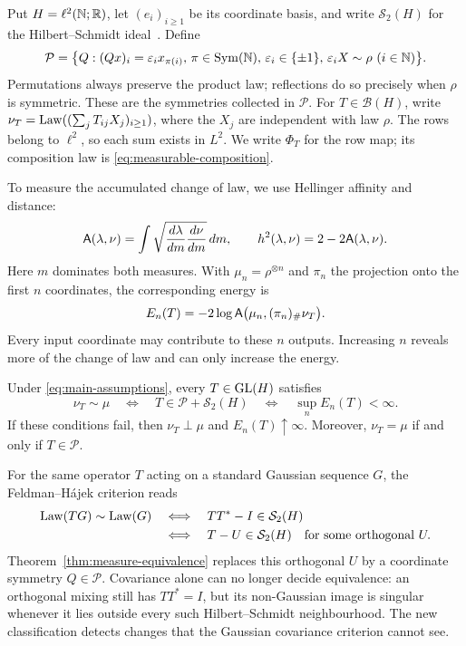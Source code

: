 Put \(H=\ell^2(\mathbb N;\mathbb R)\), let \((e_i)_{i\ge1}\) be its coordinate basis, and
write \(\mathcal S_2(H)\) for the Hilbert--Schmidt ideal~\cite{simon2005trace}.
Define
\begin{equation}
 \mathcal P=\bigl\{Q:(Qx)_i=\varepsilon_i x_{\pi(i)},\,
       \pi\in\operatorname{Sym}(\mathbb N),\,
       \varepsilon_i\in\{\pm1\},\,
       \varepsilon_iX\sim\rho\ (i\in\mathbb N)\bigr\}.
\end{equation}
Permutations always preserve the product law; reflections do so precisely
when \(\rho\) is symmetric. These are the symmetries collected in
\(\mathcal P\). For \(T\in\mathcal B(H)\), write
\(\nu_T=\operatorname{Law}((\sum_jT_{ij}X_j)_{i\ge1})\), where the \(X_j\) are independent
with law \(\rho\). The rows belong to \(\ell^2\), so each sum exists in
\(L^2\). We write \(\Phi_T\) for the row map; its composition law is
\eqref{eq:measurable-composition}.

To measure the accumulated change of law, we use Hellinger affinity and
distance:
\begin{equation}
 \mathsf A(\lambda,\nu)
 =\int\sqrt{\frac{d\lambda}{dm}\frac{d\nu}{dm}}\,dm,
 \qquad
 h^2(\lambda,\nu)=2-2\mathsf A(\lambda,\nu).
\end{equation}
Here \(m\) dominates both measures. With \(\mu_n=\rho^{\otimes n}\) and
\(\pi_n\) the projection onto the first \(n\) coordinates, the corresponding
energy is
\begin{equation}
 E_n(T)=-2\log\mathsf A\bigl(\mu_n,(\pi_n)_\#\nu_T\bigr).
 \label{eq:projected-hellinger-energy}
\end{equation}
Every input coordinate may contribute to these \(n\) outputs. Increasing
\(n\) reveals more of the change of law and can only increase the energy.

\begin{theorem}
\label{thm:measure-equivalence}
Under \eqref{eq:main-assumptions}, every \(T\in\operatorname{GL}(H)\) satisfies
\begin{equation}
 \boxed{
 \nu_T\sim\mu
 \quad\Longleftrightarrow\quad
 T\in\mathcal P+\mathcal S_2(H)
 \quad\Longleftrightarrow\quad \sup_nE_n(T)<\infty.
 }
\end{equation}
If these conditions fail, then \(\nu_T\perp\mu\) and
\(E_n(T)\uparrow\infty\).  Moreover, \(\nu_T=\mu\) if and only if
\(T\in\mathcal P\).
\end{theorem}

For the same operator \(T\) acting on a standard Gaussian sequence \(G\),
the Feldman--H\'ajek criterion reads
\[
 \begin{aligned}
 \operatorname{Law}(TG)\sim\operatorname{Law}(G)
 &\quad\Longleftrightarrow\quad TT^*-I\in\mathcal S_2(H)\\
 &\quad\Longleftrightarrow\quad T-U\in\mathcal S_2(H)
       \quad\text{for some orthogonal }U.
 \end{aligned}
\]
Theorem~\ref{thm:measure-equivalence} replaces this orthogonal \(U\) by a
coordinate symmetry \(Q\in\mathcal P\). Covariance alone can no longer
decide equivalence: an orthogonal mixing still has \(TT^*=I\), but its
non-Gaussian image is singular whenever it lies outside every such
Hilbert--Schmidt neighbourhood. The new classification detects changes
that the Gaussian covariance criterion cannot see.

